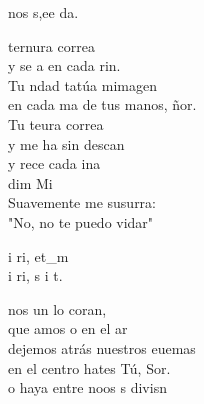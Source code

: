 \documentclass[12pt]{article}
\begin{document}
\begin{multicols*}{2}
\begin{cancion}%
	 nos s,ee da.\\
\end{cancion}%

\begin{cancion}[Tu ternura][Ixcís]%
	 ternura correa\\
	y se a en cada rin.\\
	Tu ndad tatúa mimagen\\
	en cada ma de tus manos, ñor.\\
	Tu teura correa\\
	y me ha sin descan\\
	y rece cada ina\\
     dim        Mi\\
Suavemente me susurra:\\
	"No, no te puedo vidar"\\
\end{cancion}%

\begin{cancion}%
	i ri, et_m \\
	i ri, s i t.\\
\end{cancion}%

\begin{cancion}%
	nos un lo coran, \\
	que amos o en el ar \\
	dejemos atrás nuestros euemas\\
	en el centro hates Tú, Sor. \\
	o haya entre noos s divisn  \\
\end{cancion}%


\end{multicols*}
\end{document}
